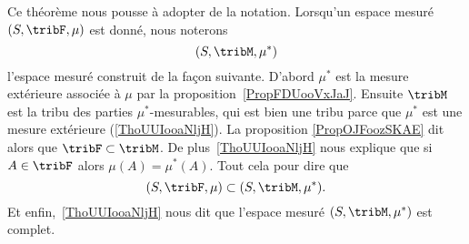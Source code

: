 \begin{normaltext}

Ce théorème nous pousse à adopter de la notation. Lorsqu'un espace mesuré \( (S,\tribF,\mu)\) est donné, nous noterons
\begin{equation}
    (S,\tribM,\mu^*)
\end{equation}
l'espace mesuré construit de la façon suivante. D'abord \( \mu^*\) est la mesure extérieure associée à \( \mu\) par la proposition~\ref{PropFDUooVxJaJ}. Ensuite \( \tribM\) est la tribu des parties \( \mu^*\)-mesurables, qui est bien une tribu parce que \( \mu^*\) est une mesure extérieure (\ref{ThoUUIooaNljH}). La proposition \eqref{PropOJFoozSKAE} dit alors que \( \tribF\subset\tribM\). De plus~\ref{ThoUUIooaNljH} nous explique que si \( A\in\tribF\) alors \( \mu(A)=\mu^*(A)\). Tout cela pour dire que
\begin{equation}    \label{EqXDPooKwWAF}
    (S,\tribF,\mu)\subset (S,\tribM,\mu^*).
\end{equation}
Et enfin,~\ref{ThoUUIooaNljH} nous dit que l'espace mesuré \( (S,\tribM,\mu^*)\) est complet.
\end{normaltext}

